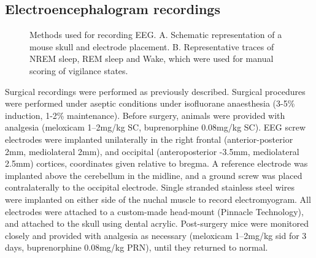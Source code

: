 \subsection{Electroencephalogram recordings}

\begin{figure}[h]
    \centering
\caption[Methods]{
Methods used for recording EEG.
A. Schematic representation of a mouse skull and electrode placement.
B. Representative traces of NREM sleep, REM sleep and Wake, which were used
for manual scoring of vigilance states.
}
\label{fig:methods}
\end{figure}

Surgical recordings were performed as previously described\cite{fisher_stereotypic_2016}.
Surgical procedures were performed under aseptic conditions under isofluorane
anaesthesia (3-5\% induction, 1-2\% maintenance).
Before surgery, animals were provided with analgesia (meloxicam 1--2mg/kg SC,
buprenorphine 0.08mg/kg SC).
EEG screw electrodes were implanted unilaterally in the right frontal
(anterior-posterior 2mm, mediolateral 2mm), and occipital (anteroposterior 
	-3.5mm, mediolateral 2.5mm) cortices, coordinates given relative to bregma.
A reference electrode was implanted above the cerebellum in the midline, and
a ground screw was placed contralaterally to the occipital electrode.
Single stranded stainless steel wires were implanted on either side of the
nuchal muscle to record electromyogram.
All electrodes were attached to a custom-made head-mount (Pinnacle
Technology), and attached to the skull using dental acrylic.
Post-surgery mice were monitored closely and provided with analgesia as
necessary (meloxicam 1--2mg/kg sid for 3 days, buprenorphine 0.08mg/kg PRN),
until they returned to normal.

